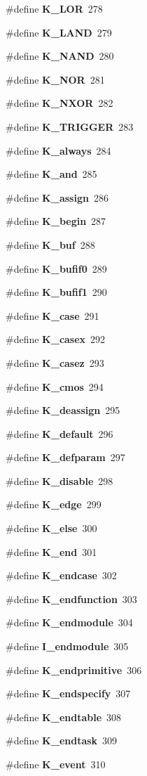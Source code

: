 \begin{CompactItemize}
\#define {\bf K\_\-LOR}\ 278
\item 
\#define {\bf K\_\-LAND}\ 279
\item 
\#define {\bf K\_\-NAND}\ 280
\item 
\#define {\bf K\_\-NOR}\ 281
\item 
\#define {\bf K\_\-NXOR}\ 282
\item 
\#define {\bf K\_\-TRIGGER}\ 283
\item 
\#define {\bf K\_\-always}\ 284
\item 
\#define {\bf K\_\-and}\ 285
\item 
\#define {\bf K\_\-assign}\ 286
\item 
\#define {\bf K\_\-begin}\ 287
\item 
\#define {\bf K\_\-buf}\ 288
\item 
\#define {\bf K\_\-bufif0}\ 289
\item 
\#define {\bf K\_\-bufif1}\ 290
\item 
\#define {\bf K\_\-case}\ 291
\item 
\#define {\bf K\_\-casex}\ 292
\item 
\#define {\bf K\_\-casez}\ 293
\item 
\#define {\bf K\_\-cmos}\ 294
\item 
\#define {\bf K\_\-deassign}\ 295
\item 
\#define {\bf K\_\-default}\ 296
\item 
\#define {\bf K\_\-defparam}\ 297
\item 
\#define {\bf K\_\-disable}\ 298
\item 
\#define {\bf K\_\-edge}\ 299
\item 
\#define {\bf K\_\-else}\ 300
\item 
\#define {\bf K\_\-end}\ 301
\item 
\#define {\bf K\_\-endcase}\ 302
\item 
\#define {\bf K\_\-endfunction}\ 303
\item 
\#define {\bf K\_\-endmodule}\ 304
\item 
\#define {\bf I\_\-endmodule}\ 305
\item 
\#define {\bf K\_\-endprimitive}\ 306
\item 
\#define {\bf K\_\-endspecify}\ 307
\item 
\#define {\bf K\_\-endtable}\ 308
\item 
\#define {\bf K\_\-endtask}\ 309
\item 
\#define {\bf K\_\-event}\ 310
\item 

\end{CompactItemize}
